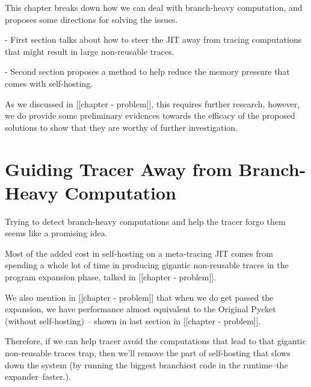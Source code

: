     \begin{paragraph-here}
      This chapter breaks down how we can deal with branch-heavy computation, and proposes some directions for solving the issues.

        - First section talks about how to steer the JIT away from tracing computations that might result in large non-reusable traces.

        - Second section proposes a method to help reduce the memory pressure that comes with self-hosting.
    \end{paragraph-here}

    \begin{paragraph-here}
      As we discussed in [[chapter - problem]], this requires further research, however, we do provide some preliminary evidences towards the efficacy of the proposed solutions to show that they are worthy of further investigation.
    \end{paragraph-here}


	\section{Guiding Tracer Away from Branch-Heavy Computation}
		\begin{mainpoint}
			Trying to detect branch-heavy computations and help the tracer forgo them seems like a promising idea.
		\end{mainpoint}


    \begin{paragraph-here}
      Most of the added cost in self-hosting on a meta-tracing JIT comes from spending a whole lot of time in producing gigantic non-reusable traces in the program expansion phase, talked in [[chapter - problem]].
    \end{paragraph-here}

    \begin{paragraph-here}
      We also mention in [[chapter - problem]] that when we do get passed the expansion, we have performance almost equivalent to the Original Pycket (without self-hosting) -- shown in last section in [[chapter - problem]].
    \end{paragraph-here}

    \begin{paragraph-here}
      Therefore, if we can help tracer avoid the computations that lead to that gigantic non-reusable traces trap, then we'll remove the part of self-hosting that slows down the system (by running the biggest branchiest code in the runtime--the expander--faster.).
    \end{paragraph-here}

